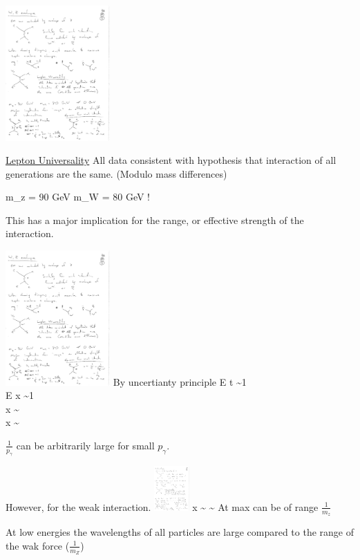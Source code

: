 {\includegraphics[width=0.3\textwidth]{./NuScattering.pdf}   

\underline{Lepton Universality}
All data consistent with hypothesis that interaction of all generations are the same.
(Modulo mass differences)

\be
m_z = 90 GeV \hspace*{0.5in} m_W = 80 GeV    !
\ee

This has a major implication for the range, or effective strength of the interaction.

\includegraphics[width=0.3\textwidth]{./eeGamma.pdf}   
By uncertianty principle 
\bea
E \times t \sim 1 \\
E \times x \sim 1 \\
x \sim {} \\ 
x \sim {}
\eea

$\frac{1}{p_\gamma}$ can be arbitrarily large for small $p_\gamma$.

However, for the weak interaction. 
\includegraphics[width=0.1\textwidth]{./eeZScattering.pdf}   
\bea
x \sim {} \sim {} 
\eea
At max can be of range $\frac{1}{m_z}$


\clearpage

At low energies the wavelengths of all particles are large compared  to the range of the wak force ($\frac{1}{m_Z}$)

}
